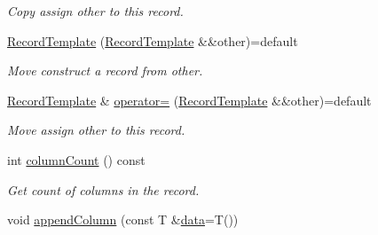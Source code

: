 \begin{DoxyCompactItemize}
\begin{DoxyCompactList}\small\item\em Copy assign {\itshape other} to this record. \end{DoxyCompactList}\item 
\hyperlink{class_mdt_1_1_plain_text_1_1_record_template_a25b068cf7af66b9e0849d7048bd89bfe}{Record\+Template} (\hyperlink{class_mdt_1_1_plain_text_1_1_record_template}{Record\+Template} \&\&other)=default\hypertarget{class_mdt_1_1_plain_text_1_1_record_template_a25b068cf7af66b9e0849d7048bd89bfe}{}\label{class_mdt_1_1_plain_text_1_1_record_template_a25b068cf7af66b9e0849d7048bd89bfe}

\begin{DoxyCompactList}\small\item\em Move construct a record from {\itshape other}. \end{DoxyCompactList}\item 
\hyperlink{class_mdt_1_1_plain_text_1_1_record_template}{Record\+Template} \& \hyperlink{class_mdt_1_1_plain_text_1_1_record_template_a4e591d4288dad785a7ea1989cf855a17}{operator=} (\hyperlink{class_mdt_1_1_plain_text_1_1_record_template}{Record\+Template} \&\&other)=default\hypertarget{class_mdt_1_1_plain_text_1_1_record_template_a4e591d4288dad785a7ea1989cf855a17}{}\label{class_mdt_1_1_plain_text_1_1_record_template_a4e591d4288dad785a7ea1989cf855a17}

\begin{DoxyCompactList}\small\item\em Move assign {\itshape other} to this record. \end{DoxyCompactList}\item 
int \hyperlink{class_mdt_1_1_plain_text_1_1_record_template_a21045038e15420a6368501650f9564bc}{column\+Count} () const \hypertarget{class_mdt_1_1_plain_text_1_1_record_template_a21045038e15420a6368501650f9564bc}{}\label{class_mdt_1_1_plain_text_1_1_record_template_a21045038e15420a6368501650f9564bc}

\begin{DoxyCompactList}\small\item\em Get count of columns in the record. \end{DoxyCompactList}\item 
void \hyperlink{class_mdt_1_1_plain_text_1_1_record_template_a18a781239310262f4c993018d7640070}{append\+Column} (const T \&\hyperlink{class_mdt_1_1_plain_text_1_1_record_template_aa6687a1e8e82a96fe3ae4d9fd79e8362}{data}=T())\hypertarget{class_mdt_1_1_plain_text_1_1_record_template_a18a781239310262f4c993018d7640070}{}\label{class_mdt_1_1_plain_text_1_1_record_template_a18a781239310262f4c993018d7640070}


\end{DoxyCompactItemize}
